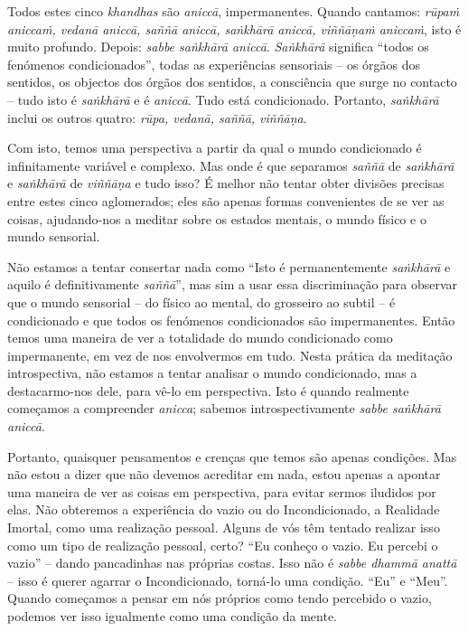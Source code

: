 Todos estes cinco \emph{khandhas} são \emph{aniccā}, impermanentes. Quando
cantamos: \emph{rūpaṁ aniccaṁ, vedanā aniccā, saññā aniccā, saṅkhārā aniccā,
  viññāṇaṁ aniccaṁ}, isto é muito profundo. Depois: \emph{sabbe saṅkhārā aniccā}.
  \emph{Saṅkhārā} significa ``todos os fenómenos condicionados'', todas as
experiências sensoriais -- os órgãos dos sentidos, os objectos dos órgãos dos
sentidos, a consciência que surge no contacto -- tudo isto é \emph{saṅkhārā} e é
\emph{aniccā}. Tudo está condicionado. Portanto, \emph{saṅkhārā} inclui os
outros quatro: \emph{rūpa, vedanā, saññā, viññāṇa}.

Com isto, temos uma perspectiva a partir da qual o mundo condicionado é
infinitamente variável e complexo. Mas onde é que separamos \emph{saññā} de
\emph{saṅkhārā} e \emph{saṅkhārā} de \emph{viññāṇa} e tudo isso? É melhor não
tentar obter divisões precisas entre estes cinco aglomerados; eles são apenas
formas convenientes de se ver as coisas, ajudando-nos a meditar sobre os estados
mentais, o mundo físico e o mundo sensorial.

Não estamos a tentar consertar nada como ``Isto é permanentemente
\emph{saṅkhārā} e aquilo é definitivamente \emph{saññā}'', mas sim a usar essa
discriminação para observar que o mundo sensorial -- do físico ao mental, do
grosseiro ao subtil -- é condicionado e que todos os fenómenos condicionados são
impermanentes. Então temos uma maneira de ver a totalidade do mundo condicionado
como impermanente, em vez de nos envolvermos em tudo. Nesta prática da meditação
introspectiva, não estamos a tentar analisar o mundo condicionado, mas a
destacarmo-nos dele, para vê-lo em perspectiva. Isto é quando realmente
começamos a compreender \emph{anicca}; sabemos introspectivamente \emph{sabbe
  saṅkhārā aniccā}.

Portanto, quaisquer pensamentos e crenças que temos são apenas condições. Mas
não estou a dizer que não devemos acreditar em nada, estou apenas a apontar uma
maneira de ver as coisas em perspectiva, para evitar sermos iludidos por elas.
Não obteremos a experiência do vazio ou do Incondicionado, a Realidade Imortal,
como uma realização pessoal. Alguns de vós têm tentado realizar isso como um
tipo de realização pessoal, certo? ``Eu conheço o vazio. Eu percebi o vazio'' --
dando pancadinhas nas próprias costas. Isso não é \emph{sabbe dhammā anattā} --
isso é querer agarrar o Incondicionado, torná-lo uma condição. ``Eu'' e ``Meu''.
Quando começamos a pensar em nós próprios como tendo percebido o vazio, podemos
ver isso igualmente como uma condição da mente.

